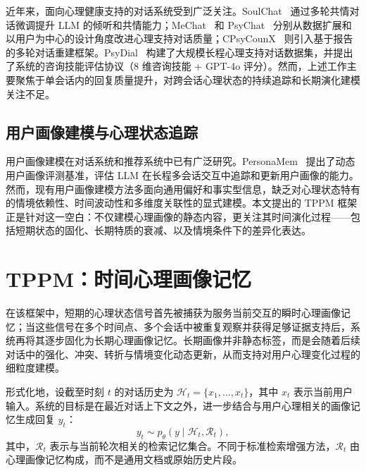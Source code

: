 \documentclass[12pt,a4paper]{article}
\newcommand{\methodname}{\textsc{TPPM}}
\begin{document}
近年来，面向心理健康支持的对话系统受到广泛关注。SoulChat~\cite{chen2023soulchat} 通过多轮共情对话微调提升 LLM 的倾听和共情能力；MeChat~\cite{qiu2024smile} 和 PsyChat~\cite{qiu2024psychat} 分别从数据扩展和以用户为中心的设计角度改进心理支持对话质量；CPsyCounX~\cite{zhang2024cpsycoun} 则引入基于报告的多轮对话重建框架。PsyDial~\cite{qiu2025psydial} 构建了大规模长程心理支持对话数据集，并提出了系统的咨询技能评估协议（8 维咨询技能 + GPT-4o 评分）。然而，上述工作主要聚焦于单会话内的回复质量提升，对跨会话心理状态的持续追踪和长期演化建模关注不足。

\subsection{用户画像建模与心理状态追踪}

用户画像建模在对话系统和推荐系统中已有广泛研究。PersonaMem~\cite{jiang2025personamem} 提出了动态用户画像评测基准，评估 LLM 在长程多会话交互中追踪和更新用户画像的能力。然而，现有用户画像建模方法多面向通用偏好和事实型信息，缺乏对心理状态特有的情境依赖性、时间波动性和多维度关联性的显式建模。本文提出的 TPPM 框架正是针对这一空白：不仅建模心理画像的静态内容，更关注其时间演化过程——包括短期状态的固化、长期特质的衰减、以及情境条件下的差异化表达。

\section{\texorpdfstring{\methodname{}}{TPPM}：时间心理画像记忆}
\label{sec:tppm}

在该框架中，短期的心理状态信号首先被捕获为服务当前交互的瞬时心理画像记忆；当这些信号在多个时间点、多个会话中被重复观察并获得足够证据支持后，系统再将其逐步固化为长期心理画像记忆。长期画像并非静态标签，而是会随着后续对话中的强化、冲突、转折与情境变化动态更新，从而支持对用户心理变化过程的细粒度建模。

形式化地，设截至时刻 $t$ 的对话历史为 $\mathcal{H}_t = \{x_1, \dots, x_t\}$，其中 $x_t$ 表示当前用户输入。系统的目标是在最近对话上下文之外，进一步结合与用户心理相关的画像记忆生成回复 $y_t$：
\begin{equation}
y_t \sim p_\theta(y \mid \mathcal{H}_t, \mathcal{R}_t),
\label{eq:gen}
\end{equation}
其中，$\mathcal{R}_t$ 表示与当前轮次相关的检索记忆集合。不同于标准检索增强方法，$\mathcal{R}_t$ 由心理画像记忆构成，而不是通用文档或原始历史片段。
\end{document}
